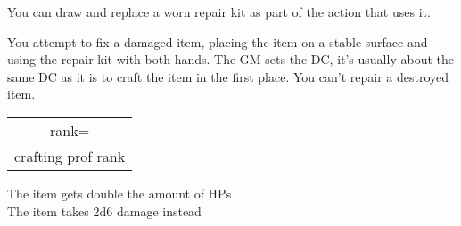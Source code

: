 


You can draw and replace a worn repair kit as part of the action that uses it.

You attempt to fix a damaged item, placing the item on a stable surface and using the repair kit with both hands.
The GM sets the DC, it's usually about the same DC as it is to craft the item in the first place.
You can't repair a destroyed item.

 \begin{tabular}{c}rank=\\crafting prof rank\end{tabular}

 The item gets double the amount of HPs \\
 The item takes 2d6 damage instead
\vfill

\hfill{}
